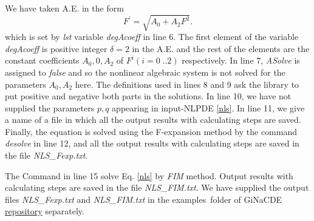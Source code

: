 \documentclass[prd,aps,floats,showkeys,nofootinbib,notitlepage]{revtex4-2}
\begin{document}
	We have taken A.E. in the form
	\begin{equation}\label{nlsAE}
		F^{\prime}=\sqrt{A_0+A_2F^2}.
	\end{equation}
	which is set by {\em lst} variable {\em degAcoeff} in line 6. The first element of the variable {\em degAcoeff} is positive integer $\delta=2$ in the A.E. and the rest of the elements are the constant coefficients $A_0,0,A_2$ of $F^i(i=0\;..2)$ respectively. In line 7, {\em ASolve} is assigned to {\em false} and so the nonlinear algebraic system is not solved for the parameters $A_0,A_2$ here. The definitions used in lines 8 and 9 ask the library to put positive and negative both parts in the solutions. In line 10, we have not supplied the parameters $p,q$ appearing in input-NLPDE \eqref{nls}.
	In line 11, we give a name of a file in which all the output results with calculating steps are saved.
	Finally, the equation is solved using the F-expansion method by the command {\em desolve} in line 12, and all the output results with calculating steps are saved in the file \emph{NLS{\_}Fexp.txt}. 
	\par The Command in line 15 solve Eq. \eqref{nls} by {\em FIM} method. 
	Output results with calculating steps are saved in the file \emph{NLS\_FIM.txt}. 
	We have supplied the output files \emph{NLS{\_}Fexp.txt} and \emph{NLS\_FIM.txt} in the examples\ folder of GiNaCDE \href{https://github.com/mithun218/GiNaCDE}{repository} separately.
\end{document}
